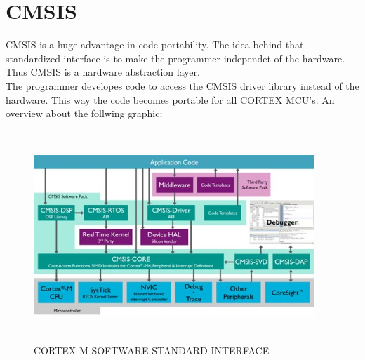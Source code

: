 \chapter{CMSIS}
CMSIS is a huge advantage in code portability. The idea behind that standardized
interface is to make the programmer independet of the hardware. Thus CMSIS is a
hardware abstraction layer.\\
The programmer developes code to access the CMSIS driver library instead of the
hardware. This way the code becomes portable for all CORTEX MCU's.
An overview about the follwing graphic:\\

\begin{figure}[ht]
	\centering
	\includegraphics[width=400px, height=300px]{../img/cmsis.jpg}
	\caption{CORTEX M SOFTWARE STANDARD INTERFACE}
	\label{cmsis_}
\end{figure}
